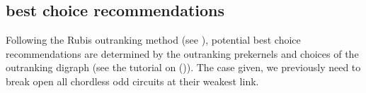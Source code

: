 \documentclass[a4paper,12pt,english]{sphinxhowto}
\begin{document}
\subsection{ best choice recommendations}
\label{\detokenize{tutorial:rubis-best-choice-recommendations}}
Following the Rubis outranking method (see ), potential best choice recommendations are determined by the outranking prekernels \textendash{} and  choices\textendash{} of the outranking digraph (see the tutorial on {\hyperref[\detokenize{tutorial:kernel-tutorial-label}]{}} ()). The case given, we previously need to break open all chordless odd circuits at their weakest link.

\begin{sphinxVerbatim}[commandchars=\\\{\},numbers=left,firstnumber=1,stepnumber=1]
   
  
\end{sphinxVerbatim}
\end{document}
